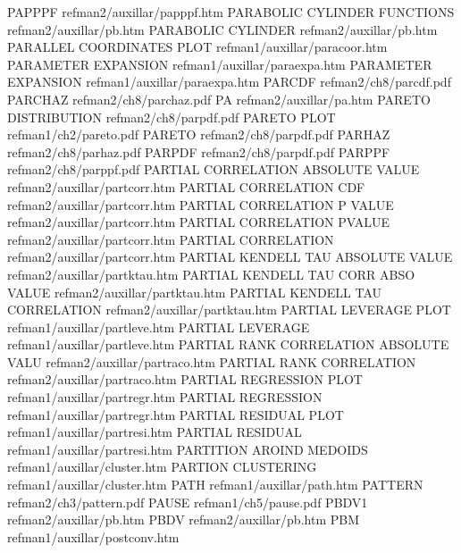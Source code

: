 PAPPPF                                  refman2/auxillar/papppf.htm
PARABOLIC CYLINDER FUNCTIONS            refman2/auxillar/pb.htm
PARABOLIC CYLINDER                      refman2/auxillar/pb.htm
PARALLEL COORDINATES PLOT               refman1/auxillar/paracoor.htm
PARAMETER EXPANSION                     refman1/auxillar/paraexpa.htm
PARAMETER EXPANSION                     refman1/auxillar/paraexpa.htm
PARCDF                                  refman2/ch8/parcdf.pdf
PARCHAZ                                 refman2/ch8/parchaz.pdf
PA                                      refman2/auxillar/pa.htm
PARETO DISTRIBUTION                     refman2/ch8/parpdf.pdf
PARETO PLOT                             refman1/ch2/pareto.pdf
PARETO                                  refman2/ch8/parpdf.pdf
PARHAZ                                  refman2/ch8/parhaz.pdf
PARPDF                                  refman2/ch8/parpdf.pdf
PARPPF                                  refman2/ch8/parppf.pdf
PARTIAL CORRELATION ABSOLUTE VALUE      refman2/auxillar/partcorr.htm
PARTIAL CORRELATION CDF                 refman2/auxillar/partcorr.htm
PARTIAL CORRELATION P VALUE             refman2/auxillar/partcorr.htm
PARTIAL CORRELATION PVALUE              refman2/auxillar/partcorr.htm
PARTIAL CORRELATION                     refman2/auxillar/partcorr.htm
PARTIAL KENDELL TAU ABSOLUTE VALUE      refman2/auxillar/partktau.htm
PARTIAL KENDELL TAU CORR ABSO VALUE     refman2/auxillar/partktau.htm
PARTIAL KENDELL TAU CORRELATION         refman2/auxillar/partktau.htm
PARTIAL LEVERAGE PLOT                   refman1/auxillar/partleve.htm
PARTIAL LEVERAGE                        refman1/auxillar/partleve.htm
PARTIAL RANK CORRELATION ABSOLUTE VALU  refman2/auxillar/partraco.htm
PARTIAL RANK CORRELATION                refman2/auxillar/partraco.htm
PARTIAL REGRESSION PLOT                 refman1/auxillar/partregr.htm
PARTIAL REGRESSION                      refman1/auxillar/partregr.htm
PARTIAL RESIDUAL PLOT                   refman1/auxillar/partresi.htm
PARTIAL RESIDUAL                        refman1/auxillar/partresi.htm
PARTITION AROIND MEDOIDS                refman1/auxillar/cluster.htm
PARTION CLUSTERING                      refman1/auxillar/cluster.htm
PATH                                    refman1/auxillar/path.htm
PATTERN                                 refman2/ch3/pattern.pdf
PAUSE                                   refman1/ch5/pause.pdf
PBDV1                                   refman2/auxillar/pb.htm
PBDV                                    refman2/auxillar/pb.htm
PBM                                     refman1/auxillar/postconv.htm
